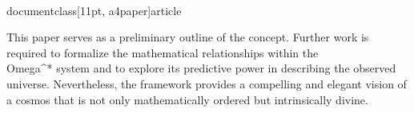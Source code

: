 \\documentclass[11pt, a4paper]{article}
\begin{document}
This paper serves as a preliminary outline of the concept. Further work is required to formalize the mathematical relationships within the \\Omega^* system and to explore its predictive power in describing the observed universe. Nevertheless, the framework provides a compelling and elegant vision of a cosmos that is not only mathematically ordered but intrinsically divine.

\
\end{document}
